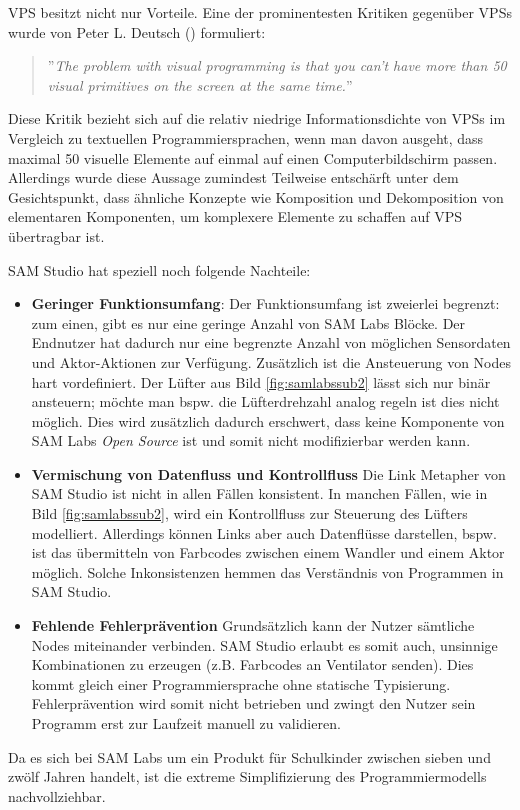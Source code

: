 \ac{VPS} besitzt nicht nur Vorteile. Eine der prominentesten Kritiken gegenüber \acp{VPS} wurde von Peter L. Deutsch (\cite{MASON201368}) formuliert:

\begin{quote}
    ''\textit{The problem with visual programming is that you can’t have more than 50 visual primitives on the screen at the same time.}''
\end{quote}


Diese Kritik bezieht sich auf die relativ niedrige Informationsdichte von \acp{VPS} im Vergleich zu textuellen Programmiersprachen, wenn man davon ausgeht, dass maximal 50 visuelle Elemente auf einmal auf einen Computerbildschirm passen. Allerdings wurde diese Aussage zumindest Teilweise entschärft unter dem Gesichtspunkt, dass ähnliche Konzepte wie Komposition und Dekomposition von elementaren Komponenten, um komplexere Elemente zu schaffen auf \ac{VPS} übertragbar ist.

SAM Studio hat speziell noch folgende Nachteile:
\begin{itemize}
    \item \textbf{Geringer Funktionsumfang}: Der Funktionsumfang ist zweierlei begrenzt: zum einen, gibt es nur eine geringe Anzahl von SAM Labs Blöcke. Der Endnutzer hat dadurch nur eine begrenzte Anzahl von möglichen Sensordaten und Aktor-Aktionen zur Verfügung. Zusätzlich ist die Ansteuerung von Nodes hart vordefiniert. Der Lüfter aus Bild \ref{fig:samlabssub2} lässt sich nur binär ansteuern; möchte man bspw. die Lüfterdrehzahl analog regeln ist dies nicht möglich. Dies wird zusätzlich dadurch erschwert, dass keine Komponente von SAM Labs \textit{Open Source} ist und somit nicht modifizierbar werden kann.
    \item \textbf{Vermischung von Datenfluss und Kontrollfluss} Die Link Metapher von SAM Studio ist nicht in allen Fällen konsistent. In manchen Fällen, wie in Bild \ref{fig:samlabssub2}, wird ein Kontrollfluss zur Steuerung des Lüfters modelliert. Allerdings können Links aber auch Datenflüsse darstellen, bspw. ist das übermitteln von Farbcodes zwischen einem Wandler und einem Aktor möglich. Solche Inkonsistenzen hemmen das Verständnis von Programmen in SAM Studio.
    \item \textbf{Fehlende Fehlerprävention} Grundsätzlich kann der Nutzer sämtliche Nodes miteinander verbinden. SAM Studio erlaubt es somit auch, unsinnige Kombinationen zu erzeugen (z.B. Farbcodes an Ventilator senden). Dies kommt gleich einer Programmiersprache ohne statische Typisierung. Fehlerprävention wird somit nicht betrieben und zwingt den Nutzer sein Programm erst zur Laufzeit manuell zu validieren.
\end{itemize}
Da es sich bei SAM Labs um ein Produkt für Schulkinder zwischen sieben und zwölf Jahren handelt, ist die extreme Simplifizierung des Programmiermodells nachvollziehbar. 

